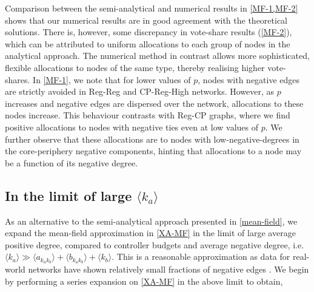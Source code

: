 Comparison between the semi-analytical and numerical results in \cref{MF-1,MF-2} shows that our numerical results are in good agreement with the theoretical solutions. There is, however, some discrepancy in vote-share results (\cref{MF-2}), which can be attributed to uniform allocations to each group of nodes in the analytical approach. The numerical method in contrast allows more sophisticated, flexible allocations to nodes of the same type, thereby realising higher vote-shares. 
In \cref{MF-1}, we note that for lower values of $p$, nodes with negative edges are strictly avoided in Reg-Reg and CP-Reg-High networks. However, as $p$ increases and negative edges are dispersed over the network, allocations to these nodes increase. This behaviour contrasts with Reg-CP graphs, where we find positive allocations to nodes with negative ties even at low values of $p$. We further observe that these allocations are to nodes with low-negative-degrees in the core-periphery negative components, hinting that allocations to a node may be a function of its negative degree.



\subsection{In the limit of large $\langle k_{a} \rangle$}
\label{limiting-case}
As an alternative to the semi-analytical approach presented in \cref{mean-field}, we expand the mean-field approximation in \cref{XA-MF} in the limit of large average positive degree, compared to controller budgets and average negative degree, i.e. $\langle k_{a} \rangle \gg \langle a_{k_{a}k_{b}} \rangle + \langle b_{k_{a}k_{b}} \rangle+\langle k_{b} \rangle$. This is a reasonable approximation as data for real-world networks have shown relatively small fractions of negative edges \cite{leskovec2010signed}. We begin by performing a series expansion on \cref{XA-MF} in the above limit to obtain,

